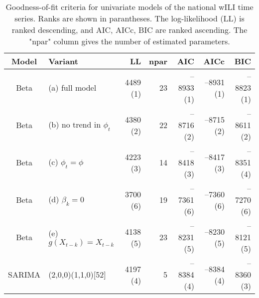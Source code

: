 \begin{table}[ht]
\centering
\begin{tabular}{cl|rrrrr}
  \hline
Model & Variant & LL & npar & AIC & AICc & BIC \\ 
  \hline
Beta & (a) full model & 4489 (1) & 23 & --8933 (1) & --8931 (1) & --8823 (1) \\ 
  Beta & (b) no trend in $\phi_t$ & 4380 (2) & 22 & --8716 (2) & --8715 (2) & --8611 (2) \\ 
  Beta & (c) $\phi_t = \phi$ & 4223 (3) & 14 & --8418 (3) & --8417 (3) & --8351 (4) \\ 
  Beta & (d) $\beta_k = 0$ & 3700 (6) & 19 & --7361 (6) & --7360 (6) & --7270 (6) \\ 
  Beta & (e) $g(X_{t-k}) = X_{t-k}$ & 4138 (5) & 23 & --8231 (5) & --8230 (5) & --8121 (5) \\ 
   \hline
SARIMA & (2,0,0)(1,1,0)[52] & 4197 (4) & 5 & --8384 (4) & --8384 (4) & --8360 (3) \\ 
   \hline
\end{tabular}
\caption{Goodness-of-fit criteria for univariate models of the national wILI time series.
             Ranks are shown in parantheses.
             The log-likelihood (LL) is ranked descending,
             and AIC, AICc, BIC are ranked ascending.
             The "npar" column gives the number of estimated parameters.} 
\label{tab:wILIsum}
\end{table}
